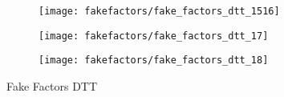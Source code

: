 \begin{figure}[htbp]
  \centering

  \begin{subfigure}{0.49\textwidth}
    \texttt{[image: fakefactors/fake\_factors\_dtt\_1516]}
  \end{subfigure}
  \begin{subfigure}{0.49\textwidth}
    \texttt{[image: fakefactors/fake\_factors\_dtt\_17]}
  \end{subfigure}

  \begin{subfigure}{0.49\textwidth}
    \texttt{[image: fakefactors/fake\_factors\_dtt\_18]}
  \end{subfigure}

  \caption{Fake Factors DTT}
  \label{fig:mjfakes_fake_factors}
\end{figure}


